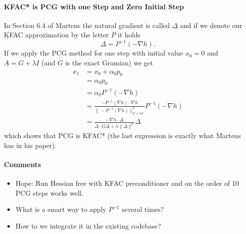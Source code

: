 \paragraph{KFAC* is PCG with one Step and Zero Initial Step}
In Section 6.4 of Martens the natural gradient is called $\Delta$ and if we denote our KFAC approximation by the letter $P$ it holds 
\[
    \Delta = P^{-1}(-\nabla h).
\]
If we apply the PCG method for one step with initial value $x_0 = 0$ and $A = G + \lambda I$ (and $G$ is the exact Gramian) we get
\begin{align*}
    x_1
    &=
    x_0 + \alpha_0 p_0
    \\
    &=
    \alpha_0p_0
    \\
    &=
    \alpha_0 P^{-1}(-\nabla h)
    \\
    &=
    \frac{-P^{-1}(\nabla h)\cdot\nabla h}{\| -P^{-1}(\nabla h) \|^2_{G+\lambda I}}P^{-1}(-\nabla h)
    \\
    &=
    \frac{-\nabla h \cdot \Delta }{\Delta \cdot G \Delta + \lambda \|\Delta\|^2}\Delta
\end{align*}
which shows that PCG is KFAC* (the last expression is exactly what Martens has in his paper).

\paragraph{Comments}
\begin{itemize}
    \item Hope: Run Hessian free with KFAC preconditioner and on the order of 10 PCG steps works well. 
    \item What is a smart way to apply $P^{-1}$ several times? 
    \item How to we integrate it in the existing codebase?
\end{itemize}